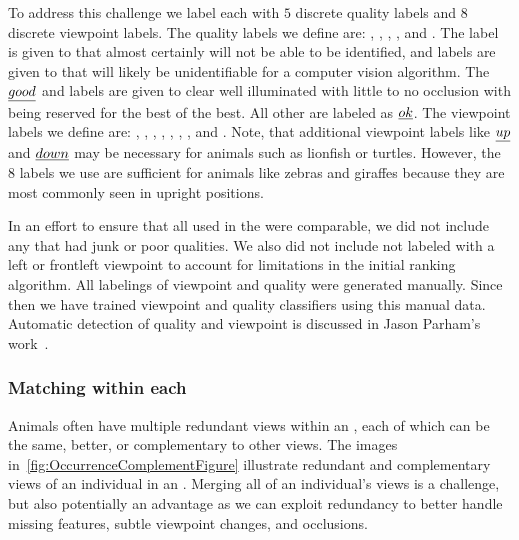             To address this challenge we label each \annot{} with $5$ discrete quality labels and $8$ discrete viewpoint
            labels. The quality labels we define are: \qualJunk{}, \qualPoor{}, \qualOk{}, \qualGood{}, and
            \qualExcellent{}. The \qualJunk{} label is given to \annots{} that almost certainly will not be able to be
            identified, and \qualPoor{} labels are given to \annots{} that will likely be unidentifiable for a computer
            vision algorithm. The $\emph{good}{}$ and \qualExcellent{} labels are given to clear well illuminated
            \annots{} with little to no occlusion with \qualExcellent{} being reserved for the best of the best. All
            other \annots{} are labeled as $\emph{ok}$. The viewpoint labels we define are: \vpFront{}, \vpFrontLeft{},
            \vpLeft{}, \vpBackLeft{}, \vpBack{}, \vpBackRight{}, \vpBack{}, and \vpFrontRight{}. Note, that additional
            viewpoint labels like $\emph{up}{}$ and $\emph{down}{}$ may be necessary for animals such as lionfish or turtles.
            However, the $8$ labels we use are sufficient for animals like zebras and giraffes because they are most
            commonly seen in upright positions.

            In an effort to ensure that all \annots{} used in the \GZC{} were comparable, we did not include any
            \annot{} that had junk or poor qualities. We also did not include \annots{} not labeled with a left or
            frontleft viewpoint to account for limitations in the initial ranking algorithm. All labelings of viewpoint
            and quality were generated manually. Since then we have trained viewpoint and quality classifiers using this
            manual data. Automatic detection of quality and viewpoint is discussed in Jason Parham's
            work~\cite{parham_photographic_2015}.

        \subsubsection{Matching within each \occurrence{}} %
            Animals often have multiple redundant views within an \occurrence{}, each of which can be the same,
            better, or complementary to other views. The images in~\cref{fig:OccurrenceComplementFigure} illustrate
            redundant and complementary views of an individual in an \occurrence{}. Merging all of an individual's
            views is a challenge, but also potentially an advantage as we can exploit redundancy to better handle
            missing features, subtle viewpoint changes, and occlusions.

